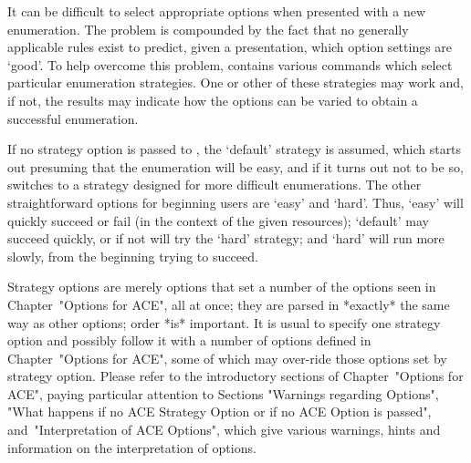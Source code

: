 

It can be difficult to select appropriate options when presented  with
a new enumeration. The problem is  compounded  by  the  fact  that  no
generally applicable rules exist to  predict,  given  a  presentation,
which option settings are \lq{}good'. To help overcome  this  problem,
{\ACE} contains various commands which select  particular  enumeration
strategies. One or other of these strategies may work and, if not, the
results may indicate how  the  options  can  be  varied  to  obtain  a
successful enumeration. 

If no strategy option is passed to {\ACE}, the `default'  strategy  is
assumed, which starts out presuming that the enumeration will be easy,
and if it turns out not to  be  so,  {\ACE}  switches  to  a  strategy
designed for more difficult enumerations.  The  other  straightforward
options for beginning users are `easy' and `hard'. Thus,  `easy'  will
quickly succeed or fail (in  the  context  of  the  given  resources);
`default' may succeed quickly, or if not will try the `hard' strategy;
and `hard' will run more slowly, from the beginning trying to succeed.

Strategy options are merely options that set a number of  the  options
seen in Chapter~"Options for ACE", all at once;  they  are  parsed  in
*exactly* the same way as other options; order *is* important.  It  is
usual to specify one strategy option and possibly  follow  it  with  a
number of options defined in Chapter~"Options for ACE", some of  which
may over-ride those options set by strategy option.  Please  refer  to
the  introductory  sections  of  Chapter~"Options  for  ACE",   paying
particular attention to Sections "Warnings regarding  Options",  "What
happens if no ACE Strategy Option or if  no  ACE  Option  is  passed",
and~"Interpretation of ACE  Options",  which  give  various  warnings,
hints and information on the interpretation of options.

